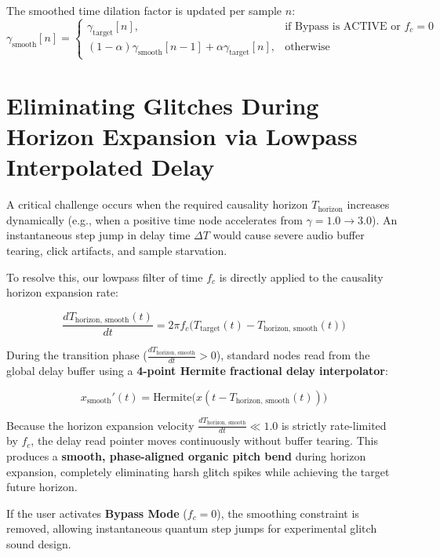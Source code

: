 \documentclass[11pt,a4paper]{article}
\begin{document}
The smoothed time dilation factor is updated per sample $n$:
\begin{equation}
\gamma_{\text{smooth}}[n] = 
\begin{cases}
\gamma_{\text{target}}[n], & \text{if Bypass is ACTIVE or } f_c = 0 \\
(1 - \alpha)\gamma_{\text{smooth}}[n-1] + \alpha \gamma_{\text{target}}[n], & \text{otherwise}
\end{cases}
\end{equation}

\section{Eliminating Glitches During Horizon Expansion via Lowpass Interpolated Delay}

A critical challenge occurs when the required causality horizon $T_{\text{horizon}}$ increases dynamically (e.g., when a positive time node accelerates from $\gamma = 1.0 \to 3.0$). An instantaneous step jump in delay time $\Delta T$ would cause severe audio buffer tearing, click artifacts, and sample starvation.

To resolve this, our lowpass filter of time $f_c$ is directly applied to the causality horizon expansion rate:

\begin{equation}
\frac{d T_{\text{horizon, smooth}}(t)}{dt} = 2\pi f_c \Big( T_{\text{target}}(t) - T_{\text{horizon, smooth}}(t) \Big)
\end{equation}

During the transition phase ($\frac{dT_{\text{horizon, smooth}}}{dt} > 0$), standard nodes read from the global delay buffer using a \textbf{4-point Hermite fractional delay interpolator}:

\begin{equation}
x_{\text{smooth}}'(t) = \text{Hermite}\Big( x(t - T_{\text{horizon, smooth}}(t)) \Big)
\end{equation}

Because the horizon expansion velocity $\frac{dT_{\text{horizon, smooth}}}{dt} \ll 1.0$ is strictly rate-limited by $f_c$, the delay read pointer moves continuously without buffer tearing. This produces a \textbf{smooth, phase-aligned organic pitch bend} during horizon expansion, completely eliminating harsh glitch spikes while achieving the target future horizon.

If the user activates \textbf{Bypass Mode} ($f_c = 0$), the smoothing constraint is removed, allowing instantaneous quantum step jumps for experimental glitch sound design.
\end{document}
